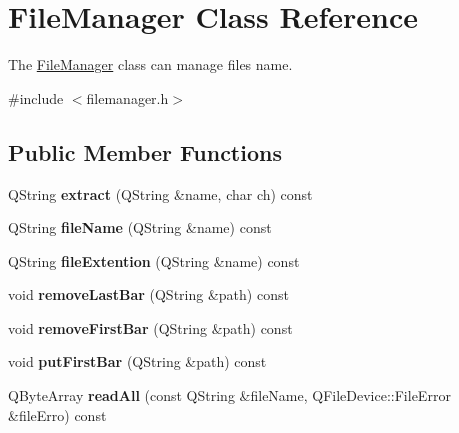 \hypertarget{class_file_manager}{}\section{File\+Manager Class Reference}
\label{class_file_manager}


The \mbox{\hyperlink{class_file_manager}{File\+Manager}} class can manage file\textquotesingle{}s name.  




{\ttfamily \#include $<$filemanager.\+h$>$}

\subsection*{Public Member Functions}
\begin{DoxyCompactItemize}
\item 
\mbox{\label{class_file_manager_a02a841bf0edcc2c338a315efdfbd716e}} 
Q\+String {\bfseries extract} (Q\+String \&name, char ch) const
\item 
\mbox{\label{class_file_manager_af8ecdb77f87698fb34f4c65ae9cde87e}} 
Q\+String {\bfseries file\+Name} (Q\+String \&name) const
\item 
\mbox{\label{class_file_manager_a91752dbc36b0cd256d09917dbcf49f30}} 
Q\+String {\bfseries file\+Extention} (Q\+String \&name) const
\item 
\mbox{\label{class_file_manager_abebe8f302627b2e8db0bf911487bd04d}} 
void {\bfseries remove\+Last\+Bar} (Q\+String \&path) const
\item 
\mbox{\label{class_file_manager_a79f0d0e4d4528d0f98496c84a43ff06b}} 
void {\bfseries remove\+First\+Bar} (Q\+String \&path) const
\item 
\mbox{\label{class_file_manager_a1fac5226f52353dd6e928ce25ae5c1cb}} 
void {\bfseries put\+First\+Bar} (Q\+String \&path) const
\item 
\mbox{\label{class_file_manager_a2f00c43fed6befb1136502c6db2f7dee}} 
Q\+Byte\+Array {\bfseries read\+All} (const Q\+String \&file\+Name, Q\+File\+Device\+::\+File\+Error \&file\+Erro) const
\end{DoxyCompactItemize}



